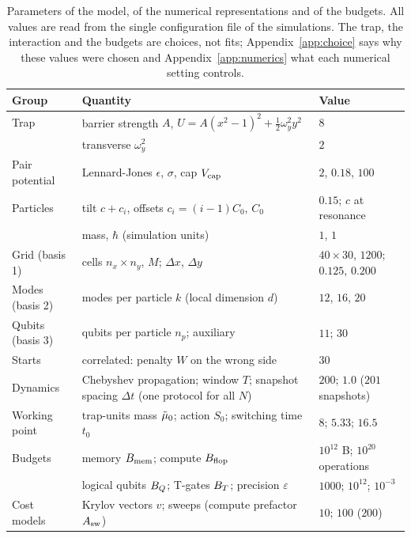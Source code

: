 \begin{table}[ht]
\centering
\footnotesize
\caption{Parameters of the model, of the numerical representations and of the budgets. All values are read from the single configuration file of the simulations. The trap, the interaction and the budgets are choices, not fits; Appendix~\ref{app:choice} says why these values were chosen and Appendix~\ref{app:numerics} what each numerical setting controls.}
\label{tab:params}
\begin{tabular}{L{2.4cm}L{7.4cm}L{4.4cm}}
\toprule
Group & Quantity & Value \\
\midrule
Trap & barrier strength $A$, $U=A(x^2-1)^2+\tfrac12\omega_y^2y^2$ & $8$ \\
 & transverse $\omega_y^2$ & $2$ \\
Pair potential & Lennard-Jones $\epsilon$, $\sigma$, cap $V_{\rm cap}$ & $2$, $0.18$, $100$ \\
Particles & tilt $c+c_i$, offsets $c_i=(i-1)C_0$, $C_0$ & $0.15$; $c$ at resonance \\
 & mass, $\hbar$ (simulation units) & $1$, $1$ \\
Grid (basis 1) & cells $n_x\times n_y$, $M$; $\Delta x$, $\Delta y$ & $40\times30$, $1200$; $0.125$, $0.200$ \\
Modes (basis 2) & modes per particle $k$ (local dimension $d$) & $12$, $16$, $20$ \\
Qubits (basis 3) & qubits per particle $n_p$; auxiliary & $11$; $30$ \\
Starts & correlated: penalty $W$ on the wrong side & $30$ \\
Dynamics & Chebyshev propagation; window $T$; snapshot spacing $\Delta t$ (one protocol for all $N$) & $200$; $1.0$ ($201$ snapshots) \\
Working point & trap-units mass $\tilde{\mu}_0$; action $S_0$; switching time $t_0$ & $8$; $5.33$; $16.5$ \\
Budgets & memory $B_{\mathrm{mem}}$; compute $B_{\mathrm{flop}}$ & $\ensuremath{10^{12}}$ B; $\ensuremath{10^{20}}$ operations \\
 & logical qubits $B_{Q}$; T-gates $B_{T}$; precision $\varepsilon$ & $1000$; $\ensuremath{10^{12}}$; $\ensuremath{10^{-3}}$ \\
Cost models & Krylov vectors $v$; sweeps (compute prefactor $A_{\rm sw}$) & $10$; $100$ ($200$) \\
\bottomrule
\end{tabular}
\end{table}
